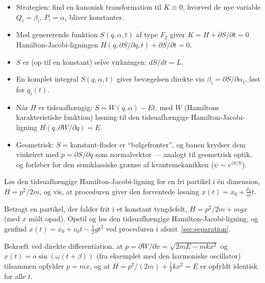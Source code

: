 \begin{itemize}
  \item Strategien: find en kanonisk transformation til
        $K\equiv 0$, hvorved de nye variable $Q_i=\beta_i$,
        $P_i=\alpha_i$ bliver konstanter.
  \item Med genererende funktion $S(q,\alpha,t)$ af type $F_2$ giver
        $K=H+\partial S/\partial t=0$ Hamilton-Jacobi-ligningen
        $H(q,\partial S/\partial q,t)+\partial S/\partial t=0$.
  \item $S$ er (op til en konstant) selve virkningen: $dS/dt=L$.
  \item En komplet integral $S(q,\alpha,t)$ giver bevægelsen direkte
        via $\beta_i=\partial S/\partial\alpha_i$, løst for $q_i(t)$.
  \item Når $H$ er tidsuafhængig: $S=W(q,\alpha)-Et$, med $W$
        (Hamiltons karakteristiske funktion) løsning til den
        tidsuafhængige Hamilton-Jacobi-ligning
        $H(q,\partial W/\partial q)=E$.
  \item Geometrisk: $S=\text{konstant}$-flader er ``bølgefronter'', og
        banen krydser dem vinkelret med $p=\partial S/\partial q$ som
        normalvektor — analogt til geometrisk optik, og forløber for
        den semiklassiske grænse af kvantemekanikken ($\psi\sim e^{iS/\hbar}$).
\end{itemize}

\begin{opgave}
Løs den tidsuafhængige Hamilton-Jacobi-ligning for en fri partikel i
én dimension, $H=p^2/2m$, og vis, at proceduren giver den forventede
løsning $x(t)=x_0+\frac{p_0}{m}t$.
\end{opgave}

\begin{opgave}
Betragt en partikel, der falder frit i et konstant tyngdefelt,
$H=p^2/2m+mgx$ (med $x$ målt opad). Opstil og løs den tidsuafhængige
Hamilton-Jacobi-ligning, og genfind $x(t)=x_0+v_0t-\frac12gt^2$ ved
proceduren i afsnit~\ref{sec:separation}.
\end{opgave}

\begin{opgave}
Bekræft ved direkte differentiation, at $p=\partial W/\partial x=
\sqrt{2mE-mkx^2}$ og $x(t)=a\sin(\omega(t+\beta))$ (fra eksemplet med
den harmoniske oscillator) tilsammen opfylder $p=m\dot x$, og at
$H=p^2/(2m)+\frac12kx^2=E$ er opfyldt identisk for alle $t$.
\end{opgave}
